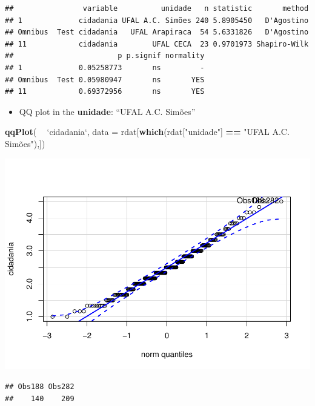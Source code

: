 \documentclass[]{article}
\newenvironment{Shaded}{\begin{snugshade}}{\end{snugshade}}
\newcommand{\DataTypeTok}[1]{\textcolor[rgb]{0.13,0.29,0.53}{#1}}
\newcommand{\KeywordTok}[1]{\textcolor[rgb]{0.13,0.29,0.53}{\textbf{#1}}}
\newcommand{\NormalTok}[1]{#1}
\newcommand{\OperatorTok}[1]{\textcolor[rgb]{0.81,0.36,0.00}{\textbf{#1}}}
\newcommand{\StringTok}[1]{\textcolor[rgb]{0.31,0.60,0.02}{#1}}
\providecommand{\tightlist}{%
  \setlength{\itemsep}{0pt}\setlength{\parskip}{0pt}}
\begin{document}
\begin{verbatim}
##                variable          unidade   n statistic       method
## 1             cidadania UFAL A.C. Simões 240 5.8905450   D'Agostino
## Omnibus  Test cidadania   UFAL Arapiraca  54 5.6331826   D'Agostino
## 11            cidadania        UFAL CECA  23 0.9701973 Shapiro-Wilk
##                        p p.signif normality
## 1             0.05258773       ns         -
## Omnibus  Test 0.05980947       ns       YES
## 11            0.69372956       ns       YES
\end{verbatim}

\begin{itemize}
\tightlist
\item
  QQ plot in the \textbf{unidade}: ``UFAL A.C. Simões''
\end{itemize}

\begin{Shaded}
\begin{Highlighting}[]
\KeywordTok{qqPlot}\NormalTok{( }\OperatorTok{~}\StringTok{ `}\DataTypeTok{cidadania}\StringTok{`}\NormalTok{, }\DataTypeTok{data =}\NormalTok{ rdat[}\KeywordTok{which}\NormalTok{(rdat[}\StringTok{"unidade"}\NormalTok{] }\OperatorTok{==}\StringTok{ "UFAL A.C. Simões"),])}
\end{Highlighting}
\end{Shaded}

\includegraphics{factorialAnova_files/figure-latex/unnamed-chunk-9-1.pdf}

\begin{verbatim}
## Obs188 Obs282 
##    140    209
\end{verbatim}
\end{document}
